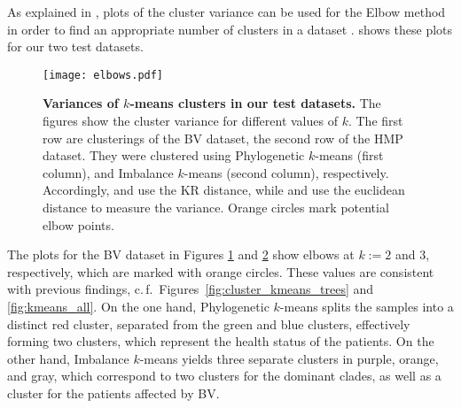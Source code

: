 As explained in ,
plots of the cluster variance can be used for the Elbow method
in order to find an appropriate number of clusters in a dataset \cite{Thorndike1953}.
 shows these plots for our two test datasets.

\begin{figure}[hpbt!]
    \centering
    \texttt{[image: elbows.pdf]}
    \begin{subfigure}{0pt}
        \label{fig:elbows:sub:bv_phylo}
    \end{subfigure}
    \begin{subfigure}{0pt}
        \label{fig:elbows:sub:bv_imb}
    \end{subfigure}
    \begin{subfigure}{0pt}
        \label{fig:elbows:sub:hmp_phylo}
    \end{subfigure}
    \begin{subfigure}{0pt}
        \label{fig:elbows:sub:hmp_imb}
    \end{subfigure}
    \caption[Variances of $k$-means clusters in our test datasets]{
        \textbf{Variances of $k$-means clusters in our test datasets.}
        The figures show the cluster variance for different values of $k$.
        The first row are clusterings of the BV dataset, the second row of the HMP dataset.
        They were clustered using Phylogenetic $k$-means (first column),
        and Imbalance $k$-means (second column), respectively.
        Accordingly,  and  use the KR distance,
        while  and  use the euclidean distance
        to measure the variance.
        Orange circles mark potential elbow points.
    }
    \label{fig:elbows}
\end{figure}

The plots for the \ac{BV} dataset in Figures \ref{fig:elbows:sub:bv_phylo} and \ref{fig:elbows:sub:bv_imb}
show elbows at $k:=2$ and $3$, respectively, which are marked with orange circles.
These values are consistent with previous findings, c.\,f.~Figures~\ref{fig:cluster_kmeans_trees} and \ref{fig:kmeans_all}.
On the one hand, Phylogenetic $k$-means splits the samples into a distinct red cluster,
separated from the green and blue clusters,
effectively forming two clusters, which represent the health status of the patients.
On the other hand, Imbalance $k$-means yields three separate clusters in purple, orange, and gray,
which correspond to two clusters for the dominant  clades,
as well as a cluster for the patients affected by \ac{BV}.

